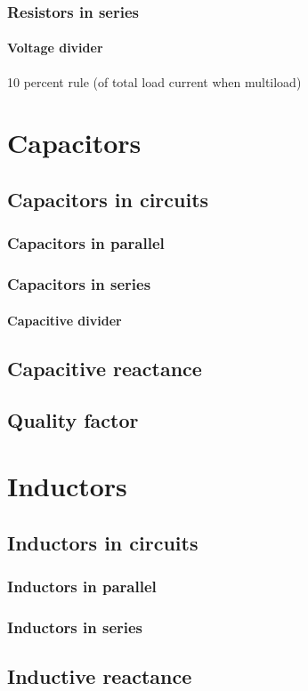 \documentclass{report}
\begin{document}
\subsubsection{Resistors in series}
\paragraph{Voltage divider}
10 percent rule (of total load current when multiload)
\section{Capacitors}
\subsection{Capacitors in circuits}
\subsubsection{Capacitors in parallel}
\subsubsection{Capacitors in series}
\paragraph{Capacitive divider}
\subsection{Capacitive reactance}
\subsection{Quality factor}
\section{Inductors}
\subsection{Inductors in circuits}
\subsubsection{Inductors in parallel}
\subsubsection{Inductors in series}
\subsection{Inductive reactance}
\end{document}
